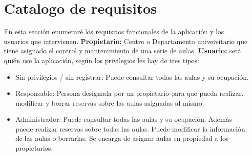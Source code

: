 \section{Catalogo de requisitos}
En esta sección enumeraré los requisitos funcionales de la aplicación y los usuarios que intervienen.\newline
\textbf{Propietario:} Centro o Departamento universitario que tiene asignado el control y mantenimiento de una serie de aulas.
\textbf{Usuario:} será quién use la aplicación, según los privilegios les hay de tres tipos:
    \begin{itemize}
        \item Sin privilegios / sin registrar: Puede consultar todas las aulas y su ocupación.
        \item Responsable: Persona designada por un propietario para que pueda realizar, modificar y borrar reservas sobre las aulas asignadas al mismo.
        \item Administrador: Puede consultar todas las aulas y su ocupación. Además puede realizar reservas sobre todas las aulas. Puede modificar la información de las aulas o borrarlas. Se encarga de asignar aulas en propiedad a los propietarios.
    \end{itemize}
